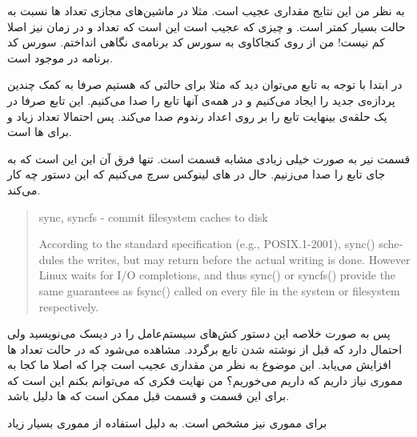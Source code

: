 به نظر من این نتایج مقداری عجیب است. مثلا در ماشین‌های مجازی تعداد
ها
نسبت به حالت
بسیار کمتر است. و چیزی که عجیب است این است که تعداد
 و 
در زمان
نیز اصلا کم نیست! من از روی کنجاکاوی به سورس کد برنامه‌ی
نگاهی انداختم. سورس کد برنامه در
موجود است.

در ابتدا با توجه به تابع
می‌توان دید که مثلا برای حالتی که
هستیم صرفا به کمک
چندین پردازه‌ی جدید را ایجاد می‌کنیم و در همه‌ی آنها تابع
را صدا می‌کنیم. این تابع صرفا در یک حلقه‌ی بینهایت تابع
را بر روی اعداد رندوم صدا می‌کند.
پس احتمالا تعداد زیاد
 و 
برای
ها
است.

قسمت
نیر به صورت خیلی زیادی مشابه قسمت
است. تنها فرق آن این این است که به جای
تابع
را صدا می‌زنیم. حال در
های
لینوکس سرچ می‌کنیم که این دستور چه کار می‌کند.
\begin{latin}
    \begin{quote}
        sync, syncfs - commit filesystem caches to disk

        According to the standard specification  (e.g.,  POSIX.1-2001),  sync()
       schedules the writes, but may return before the actual writing is done.
       However Linux waits for I/O completions, and thus  sync()  or  syncfs()
       provide the same guarantees as fsync() called on every file in the system or filesystem respectively.
    \end{quote}
\end{latin}
پس به صورت خلاصه این دستور کش‌های سیستم‌عامل را در دیسک می‌نویسید ولی احتمال دارد که قبل از نوشته شدن تابع برگردد.
مشاهده می‌شود که در حالت
تعداد
ها
افزایش می‌یابد. این موضوع به نظر من مقداری عجیب است چرا که اصلا ما کجا به مموری نیاز داریم که داریم
می‌خوریم؟ من نهایت فکری که می‌توانم بکنم این است که برای این قسمت و قسمت قبل ممکن است که
ها
دلیل
باشد.

برای مموری نیز مشخص است. به دلیل استفاده از مموری بسیار زیاد